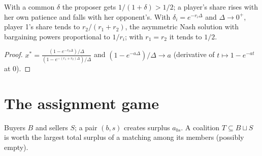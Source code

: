\begin{theorem}
\label{thm:rubinstein-limit}
\leanok
{}
With a common $\delta$ the proposer gets $1/(1+\delta) > 1/2$; a player's share rises with her own patience and falls
with her opponent's. With $\delta_i = e^{-r_i\Delta}$ and $\Delta \to 0^+$, player 1's share tends to $r_2/(r_1+r_2)$, the
asymmetric Nash solution with bargaining powers proportional to $1/r_i$; with $r_1 = r_2$ it tends to $1/2$.
\end{theorem}
\begin{proof}
\leanok
$x^* = \frac{(1-e^{-r_2\Delta})/\Delta}{(1-e^{-(r_1+r_2)\Delta})/\Delta}$ and $(1 - e^{-a\Delta})/\Delta \to a$ (derivative of $t \mapsto 1 - e^{-at}$ at $0$).
\end{proof}

\section{The assignment game}
\label{sec:assignment-game}

\begin{definition}
\label{def:assignment-game}
\leanok
Buyers $B$ and sellers $S$; a pair $(b,s)$ creates surplus $a_{bs}$. A coalition $T \subseteq B \sqcup S$ is worth the
largest total surplus of a matching among its members (possibly empty).
\end{definition}


